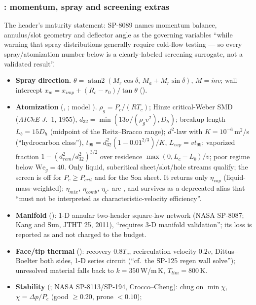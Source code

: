 \subsubsection*{: momentum, spray and screening extras}

The header's maturity statement: SP-8089 names momentum balance, annulus/slot
geometry and deflector angle as the governing variables ``while warning that spray
distributions generally require cold-flow testing — so every spray/atomization
number below is a clearly-labeled screening surrogate, not a validated result''.
\begin{itemize}
\item \textbf{Spray direction.} $\theta=\operatorname{atan2}(M_r\cos\delta,\,M_a+M_r\sin\delta)$,
$M=\dot m v$; wall intercept $x_w=x_{imp}+(R_c-r_0)/\tan\theta$ ().
\item \textbf{Atomization} (, ; model
). $\rho_g=P_c/(RT_c)$;
Hinze critical-Weber SMD (\emph{AIChE J.}\ 1, 1955),
$d_{32}=\min(13\sigma/(\rho_gv^2),D_h)$; breakup length $L_b=15D_h$ (midpoint of
the Reitz--Bracco range); $d^2$-law with $K=10^{-6}$\,m$^2$/s (``hydrocarbon
class''), $t_{99}=d_{32}^2(1-0.01^{2/3})/K$, $L_{vap}=vt_{99}$; vaporized fraction
$1-(d_{rem}^2/d_{32}^2)^{3/2}$ over residence $\max(0,L_c-L_b)/v$; poor regime
below $\mathrm{We}_g=40$. Only liquid, subcritical sheet/slot/hole streams
qualify; the screen is off for $P_c\ge P_{crit}$ and for the Son sheet. It returns
only $\eta_{vap}$ (liquid-mass-weighted); $\eta_{mix}$, $\eta_{comb}$, $\eta_{c^*}$
are , and  survives as a deprecated
alias that ``must not be interpreted as characteristic-velocity efficiency''.
\item \textbf{Manifold} (): 1-D annular two-header square-law network
(NASA SP-8087; Kang and Sun, JTHT 25, 2011), ``requires 3-D manifold validation'';
its loss is reported as  and not charged to the budget.
\item \textbf{Face/tip thermal} (): recovery $0.8T_c$, recirculation
velocity $0.2v$, Dittus--Boelter both sides, 1-D series circuit (``cf.\ the SP-125
regen wall solve''); unresolved material falls back to $k=350$\,W/m\,K,
$T_{lim}=800$\,K.
\item \textbf{Stability} (; NASA SP-8113/SP-194, Crocco--Cheng):
chug on $\min\chi$, $\chi=\Delta p/P_c$ (good $\ge0.20$, prone $<0.10$);

\end{itemize}
